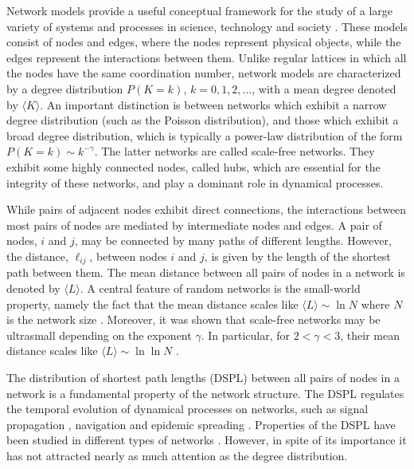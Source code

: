 \documentclass[preprint,pre,superscriptaddress,showpacs]{revtex4}
\begin{document}
Network models provide a useful conceptual framework 
for the study of a large variety of systems and processes
in science, technology and society
\cite{Havlin2010,Newman2010,Estrada2011,Barrat2012}.
These models consist of nodes and edges, where the nodes
represent physical objects, while the edges represent the
interactions between them.
Unlike regular lattices in which all the nodes have the same coordination
number, network models are characterized by a degree distribution
$P(K=k)$, $k=0,1,2,\dots$,
with a mean degree denoted by $\langle K \rangle$.
An important distinction is between networks which exhibit
a narrow degree distribution 
(such as the Poisson distribution), 
and those which exhibit a broad degree distribution,
which is typically a power-law distribution of the form 
$P(K=k) \sim k^{-\gamma}$.
The latter networks are called scale-free networks.
They exhibit some highly connected nodes, called hubs,
which are essential for the integrity of these networks, and
play a dominant role in dynamical processes.

While pairs of adjacent nodes exhibit direct connections,
the interactions between most pairs of nodes
are mediated by intermediate nodes and edges.
A pair of nodes, $i$ and $j$, may be connected by many paths
of different lengths.
However, the distance, $\ell_{ij}$, between nodes $i$ and $j$, is given by 
the length of the shortest path between them.
The mean distance between all pairs of nodes in a network is denoted by 
$\langle L \rangle$.
A central feature of random networks is the small-world property,
namely the fact that the mean distance 
scales like 
$\langle L \rangle \sim \ln N$
where $N$ is the network size
\cite{Milgram1969,Watts1998,Chung2002,Chung2003}.
Moreover, it was shown that scale-free networks may be
ultrasmall depending on the exponent $\gamma$.
In particular, for $2 < \gamma < 3$, 
their mean distance scales like
$\langle L \rangle \sim \ln \ln N$
\cite{Cohen2003}.
 
The distribution of shortest path lengths (DSPL) 
between all pairs of nodes in a network 
is a fundamental property of the network structure.
The DSPL regulates the temporal evolution of 
dynamical processes on networks, 
such as signal propagation
\cite{Maayan2005}, 
navigation 
\cite{Dijkstra1959,Delling2009,Abraham2013}
and epidemic spreading 
\cite{Satorras2001,Satorras2015}.
Properties of the DSPL have been studied in different types of networks
\cite{Newman2001,Blondel2007,Dorogotsev2003,Hofstad2007,Hofstad2008,Esker2008,Shao2008,Shao2009}.
However, in spite of its importance it has not attracted nearly as much attention
as the degree distribution.
\end{document}
